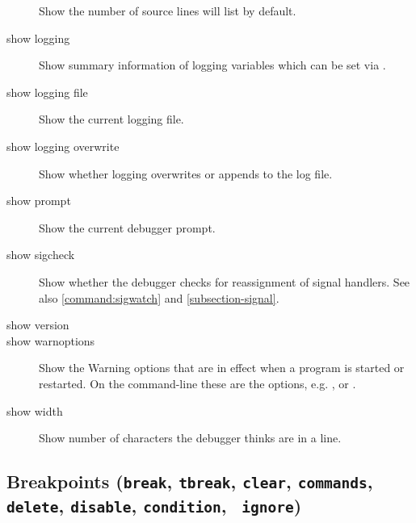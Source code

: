 \begin{description}
Show the number of source lines  will list by default.

\item[show logging]

Show summary information of logging variables which can be set via
.

\item[show logging file]

Show the current logging file.

\item[show logging overwrite]

Show whether logging overwrites or appends to the log file.

\item[show prompt]

Show the current debugger prompt.

\item[show sigcheck]

Show whether the debugger checks for reassignment of signal handlers.
See also \ref{command:sigwatch} and \ref{subsection-signal}.

%


\item[show version]

\item[show warnoptions]

Show the Warning options that are in effect when a program is started
or restarted. On the command-line these are the  options,
e.g. , or .

\item[show width]

Show number of characters the debugger thinks are in a line.

\end{description}

\subsection{Breakpoints ({\tt break}, {\tt tbreak}, {\tt clear},
  {\tt commands}, {\tt delete}, {\tt disable}, {\tt condition}, {\tt
  ignore})\label{subsubsection-brkpts}}

